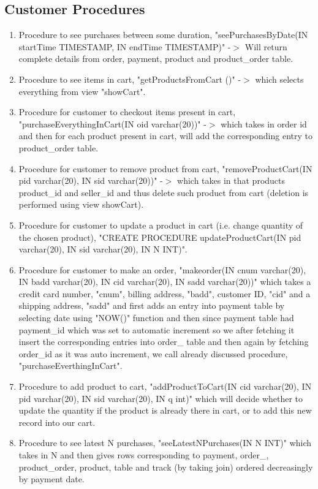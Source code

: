 \documentclass[a4paper,12pt]{article}
\begin{document}
\subsection{Customer Procedures}
\begin{enumerate}
  \item Procedure to see purchases between some duration, "seePurchasesByDate(IN startTime TIMESTAMP, IN endTime TIMESTAMP)" -$>$ Will return complete details from order, payment, product and product\_order table.
  \item Procedure to see items in cart, "getProductsFromCart ()" -$>$ which selects everything from view "showCart".
  \item Procedure for customer to checkout items present in cart, "purchaseEverythingInCart(IN oid varchar(20))" -$>$ which takes in order id and then for each product present in cart, will add the corresponding entry to product\_order table.
  \item Procedure for customer to remove product from cart, "removeProductCart(IN pid varchar(20), IN sid varchar(20))" -$>$ which takes in that products product\_id and seller\_id and thus delete such product from cart (deletion is performed using view showCart).
  \item Procedure for customer to update a product in cart (i.e. change quantity of the chosen product), "CREATE PROCEDURE updateProductCart(IN pid varchar(20), IN sid varchar(20), IN N INT)".
  \item Procedure for customer to make an order, "makeorder(IN cnum varchar(20), IN badd varchar(20), IN cid varchar(20), IN sadd varchar(20))" which takes a credit card number, "cnum", billing address, "badd", customer ID, "cid" and a shipping address, "sadd" and first adds an entry into payment table by selecting date using "NOW()" function and then since payment table had payment\_id which was set to automatic increment so we after fetching it insert the corresponding entries into order\_ table and then again by fetching order\_id as it was auto increment, we call already discussed procedure, "purchaseEverthingInCart".
  \item Procedure to add product to cart, "addProductToCart(IN cid varchar(20), IN pid varchar(20), IN sid varchar(20), IN q int)" which will decide whether to update the quantity if the product is already there in cart, or to add this new record into our cart.
  \item Procedure to see latest N purchases, "seeLatestNPurchases(IN N INT)" which takes in N and then gives rows corresponding to payment, order\_, product\_order, product, table and track (by taking join) ordered decreasingly by payment date.

\end{enumerate}
\end{document}
